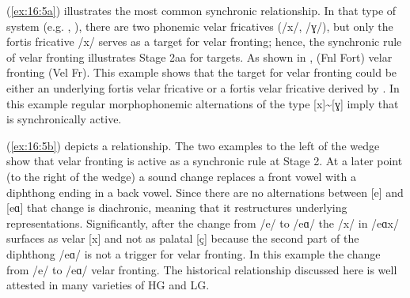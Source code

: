 
(\ref{ex:16:5a}) illustrates the most common synchronic  relationship. In that type of system (e.g. , ), there are two phonemic velar fricatives (/x/, /ɣ/), but only the fortis fricative /x/ serves as a target for velar fronting; hence, the synchronic rule of velar fronting illustrates Stage 2aa for targets. As shown in ,  (Fnl Fort)  velar fronting (Vel Fr). This example shows that the target for velar fronting could be either an underlying fortis velar fricative or a fortis velar fricative derived by . In this example regular morphophonemic alternations of the type [x]{\textasciitilde}[ɣ] imply that  is synchronically active.

(\ref{ex:16:5b}) depicts a  relationship. The two examples to the left of the wedge show that velar fronting is active as a synchronic rule at Stage 2. At a later point (to the right of the wedge) a sound change replaces a front vowel with a diphthong ending in a back vowel. Since there are no alternations between [e] and [eɑ] that change is diachronic, meaning that it restructures underlying representations. Significantly, after the change from /e/ to /eɑ/ the /x/ in /eɑx/ surfaces as velar [x] and not as palatal [ç] because the second part of the diphthong /eɑ/ is not a trigger for velar fronting. In this example the change from /e/ to /eɑ/  velar fronting. The historical  relationship discussed here is well attested in many varieties of HG and LG.

